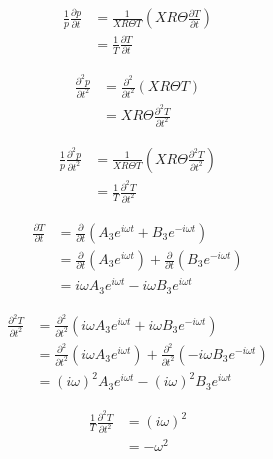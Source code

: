 \documentclass[a4paper]{report}
\begin{document}
\begin{align*}
    \frac{1}{p}\frac{\partial p}{\partial t} 
    &=
    \frac{ 1}{X R \Theta T}  \left( XR\Theta\frac{\partial T}{\partial t} \right) \\
    &=\frac{ 1}{ T}\frac{\partial T}{\partial t}  
\end{align*}

\begin{align*}
    \frac{\partial^2 p}{\partial t^2} 
    &=
    \frac{\partial^2 }{\partial t^2}  \left( XR\Theta T \right) \\
    &=
    XR\Theta\frac{\partial^2 T}{\partial t^2}  
\end{align*}


\begin{align*}
    \frac{1}{p}\frac{\partial^2 p}{\partial t^2} 
    &=
    \frac{ 1}{X R \Theta T}  \left( XR\Theta\frac{\partial^2 T}{\partial t^2} \right) \\
    &=\frac{ 1}{ T}\frac{\partial^2 T}{\partial t^2}  
\end{align*}

\begin{align*}
    \frac{\partial T}{\partial t} &=
    \frac{\partial}{\partial t}
        \left( 
        A_3 e^{i \omega t} + B_3 e^{-i \omega t}
    \right)  \\
    &=
    \frac{\partial}{\partial t} \left(A_3 e^{i \omega t}  \right) +
    \frac{\partial}{\partial t} \left(B_3 e^{-i \omega t}  \right)\\ 
    &= i \omega A_3 e^{i \omega t} - i \omega B_3 e^{i \omega t} 
\end{align*}

\begin{align*}
    \frac{\partial^2 T}{\partial t^2} &=
    \frac{\partial^2}{\partial t^2}
        \left( 
        i \omega A_3 e^{i \omega t} + i \omega B_3 e^{-i \omega t}
    \right)  \\
    &=
    \frac{\partial^2}{\partial t^2} \left(i \omega A_3 e^{i \omega t}  \right) +
    \frac{\partial^2}{\partial t^2} \left(- i \omega B_3 e^{-i \omega t}  \right)\\ 
    &= (i \omega)^2 A_3 e^{i \omega t} - (i \omega)^2 B_3 e^{i \omega t} 
\end{align*}

\begin{align*}
    \frac{1}{T}\frac{\partial^2 T}{\partial t^2} 
    &=
    (i\omega)^2 \\
    &= -\omega^2
\end{align*}
\end{document}
